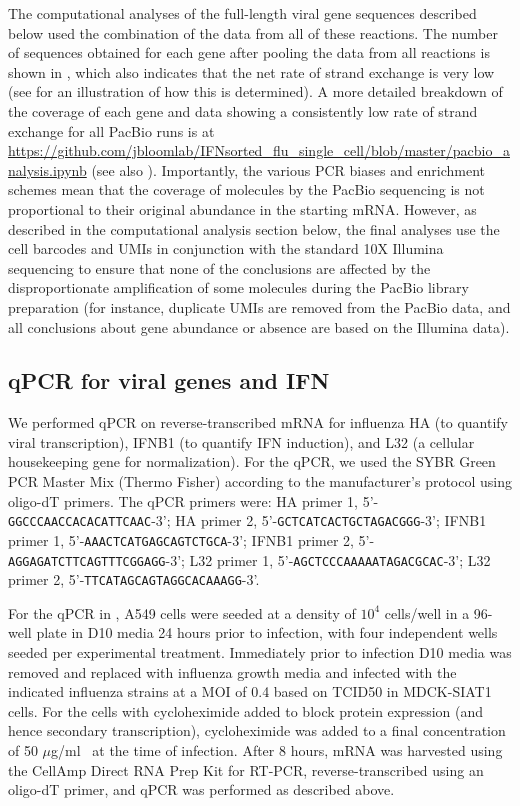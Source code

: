 \documentclass[9pt,lineno]{template}
\begin{document}
The computational analyses of the full-length viral gene sequences described below used the combination of the data from all of these reactions.
The number of sequences obtained for each gene after pooling the data from all reactions is shown in , which also indicates that the net rate of strand exchange is very low (see  for an illustration of how this is determined).
A more detailed breakdown of the coverage of each gene and data showing a consistently low rate of strand exchange for all PacBio runs is at \url{https://github.com/jbloomlab/IFNsorted_flu_single_cell/blob/master/pacbio_analysis.ipynb} (see also ).
Importantly, the various PCR biases and enrichment schemes mean that the coverage of molecules by the PacBio sequencing is not proportional to their original abundance in the starting mRNA.
However, as described in the computational analysis section below, the final analyses use the cell barcodes and UMIs in conjunction with the standard 10X Illumina sequencing to ensure that none of the conclusions are affected by the disproportionate amplification of some molecules during the PacBio library preparation (for instance, duplicate UMIs are removed from the PacBio data, and all conclusions about gene abundance or absence are based on the Illumina data).

\subsection{qPCR for viral genes and IFN}
We performed qPCR on reverse-transcribed mRNA for influenza HA (to quantify viral transcription), IFNB1 (to quantify IFN induction), and L32 (a cellular housekeeping gene for normalization).
For the qPCR, we used the SYBR Green PCR Master Mix (Thermo Fisher) according to the manufacturer's protocol using oligo-dT primers.
The qPCR primers were: HA primer 1, 5'-\texttt{GGCCCAACCACACATTCAAC}-3'; HA primer 2, 5'-\texttt{GCTCATCACTGCTAGACGGG}-3'; IFNB1 primer 1, 5'-\texttt{AAACTCATGAGCAGTCTGCA}-3'; IFNB1 primer 2, 5'-\texttt{AGGAGATCTTCAGTTTCGGAGG}-3'; L32 primer 1, 5'-\texttt{AGCTCCCAAAAATAGACGCAC}-3'; L32 primer 2, 5'-\texttt{TTCATAGCAGTAGGCACAAAGG}-3'. 

For the qPCR in , A549 cells were seeded at a density of $10^4$ cells/well in a 96-well plate in D10 media 24 hours prior to infection, with four independent wells seeded per experimental treatment. 
Immediately prior to infection D10 media was removed and replaced with influenza growth media and infected with the indicated influenza strains at a MOI of 0.4 based on TCID50 in MDCK-SIAT1 cells.
For the cells with cycloheximide added to block protein expression (and hence secondary transcription), cycloheximide was added to a final concentration of 50 $\mu$g/ml~\citep[a concentration sufficient to block secondary transcription;][]{killip2014activation} at the time of infection.
After 8 hours, mRNA was harvested using the CellAmp Direct RNA Prep Kit for RT-PCR, reverse-transcribed using an oligo-dT primer, and qPCR was performed as described above.
\end{document}
